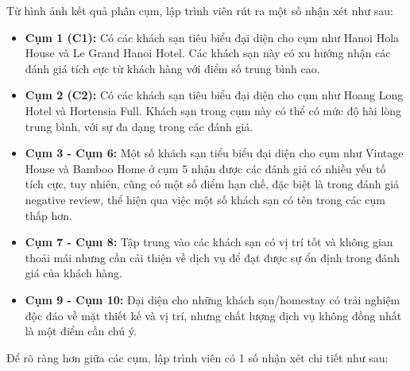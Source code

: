 Từ hình ảnh kết quả phân cụm, lập trình viên rút ra một số nhận xét như sau:
\begin{itemize}
    \item \textbf{Cụm 1 (C1):} Có các khách sạn tiêu biểu đại diện cho cụm như Hanoi Hola House và Le Grand Hanoi Hotel. Các khách sạn này có xu hướng nhận các đánh giá tích cực từ khách hàng với điểm số trung bình cao.

    \item \textbf{Cụm 2 (C2):} Có các khách sạn tiêu biểu đại diện cho cụm như Hoang Long Hotel và Hortensia Full. Khách sạn trong cụm này có thể có mức độ hài lòng trung bình, với sự đa dạng trong các đánh giá.

    \item \textbf{Cụm 3 - Cụm 6:} Một số khách sạn tiểu biểu đại diện cho cụm như Vintage House và Bamboo Home ở cụm 5 nhận được các đánh giá có nhiều yếu tố tích cực, tuy nhiên, cũng có một số điểm hạn chế, đặc biệt là trong đánh giá negative review, thể hiện qua việc một số khách sạn có tên trong các cụm thấp hơn.

    \item \textbf{Cụm 7 - Cụm 8:} Tập trung vào các khách sạn có vị trí tốt và không gian thoải mái nhưng cần cải thiện về dịch vụ để đạt được sự ổn định trong đánh giá của khách hàng.

    \item \textbf{Cụm 9 - Cụm 10:} Đại diện cho những khách sạn/homestay có trải nghiệm độc đáo về mặt thiết kế và vị trí, nhưng chất lượng dịch vụ không đồng nhất là một điểm cần chú ý.
\end{itemize}

Để rõ ràng hơn giữa các cụm, lập trình viên có 1 số nhận xét chi tiết như sau:

